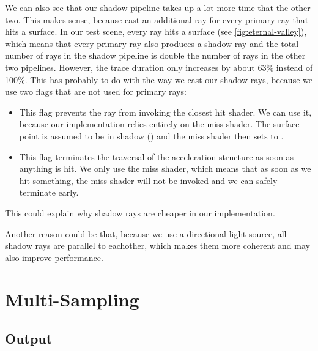 We can also see that our shadow pipeline takes up a lot more time that the other two. This makes sense, because cast an additional ray for every primary ray that hits a surface. In our test scene, every ray hits a surface (see \autoref{fig:eternal-valley}), which means that every primary ray also produces a shadow ray and the total number of rays in the shadow pipeline is double the number of rays in the other two pipelines. However, the trace duration only increases by about 63\% instead of 100\%. This has probably to do with the way we cast our shadow rays, because we use two flags that are not used for primary rays:

\begin{itemize}
    \item {}
    
    This flag prevents the ray from invoking the closest hit shader. We can use it, because our implementation relies entirely on the miss shader. The surface point is assumed to be in shadow () and the miss shader then sets  to .

    \item {}
    
    This flag terminates the traversal of the acceleration structure as soon as anything is hit. We only use the miss shader, which means that as soon as we hit something, the miss shader will not be invoked and we can safely terminate early.
\end{itemize}

This could explain why shadow rays are cheaper in our implementation.

Another reason could be that, because we use a directional light source, all shadow rays are parallel to eachother, which makes them more coherent and may also improve performance.

\section{Multi-Sampling}

\subsection{Output}

